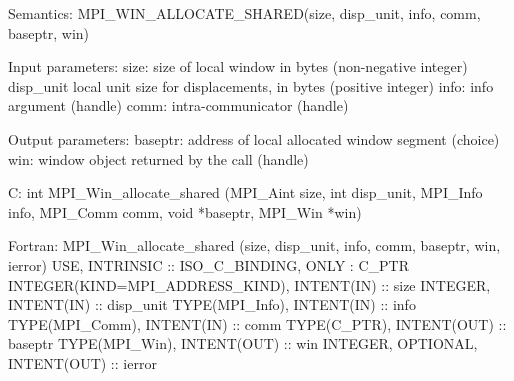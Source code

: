 Semantics:
MPI_WIN_ALLOCATE_SHARED(size, disp_unit, info, comm, baseptr, win)

Input parameters:
size: size of local window in bytes (non-negative integer)
disp_unit local unit size for displacements, in bytes (positive
integer)
info: info argument (handle)
comm: intra-communicator (handle)

Output parameters:
baseptr: address of local allocated window segment (choice)
win: window object returned by the call (handle)

C:
int MPI_Win_allocate_shared
   (MPI_Aint size, int disp_unit, MPI_Info info,
    MPI_Comm comm, void *baseptr, MPI_Win *win)

Fortran:
MPI_Win_allocate_shared
   (size, disp_unit, info, comm, baseptr, win, ierror)
USE, INTRINSIC :: ISO_C_BINDING, ONLY : C_PTR
INTEGER(KIND=MPI_ADDRESS_KIND), INTENT(IN) :: size
INTEGER, INTENT(IN) :: disp_unit
TYPE(MPI_Info), INTENT(IN) :: info
TYPE(MPI_Comm), INTENT(IN) :: comm
TYPE(C_PTR), INTENT(OUT) :: baseptr
TYPE(MPI_Win), INTENT(OUT) :: win
INTEGER, OPTIONAL, INTENT(OUT) :: ierror
